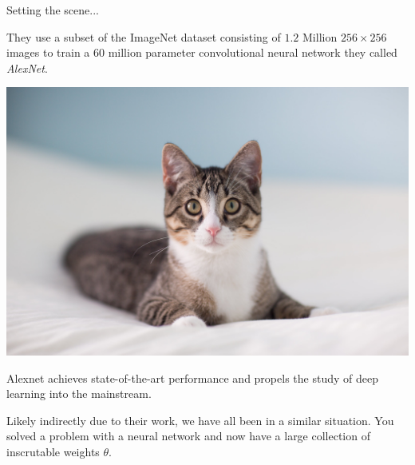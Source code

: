 \documentclass{beamer}
\begin{document}
\begin{frame}{Setting the scene...}
    
    They use a subset of the ImageNet dataset consisting of $1.2$ Million $256 \times 256$ images to train a $60$ million parameter convolutional neural network they called \emph{AlexNet}.

    \begin{center}
        \includegraphics[scale=0.03]{imagenetcat.jpg}    
    \end{center}

    \pause
    
    Alexnet achieves state-of-the-art performance and propels the study of deep learning into the mainstream. 

    \hspace{3cm}
    \pause
    
    Likely indirectly due to their work, we have all been in a similar situation. You solved a problem with a neural network and now have a large collection of inscrutable weights $\theta$.
     
\end{frame}
\end{document}
